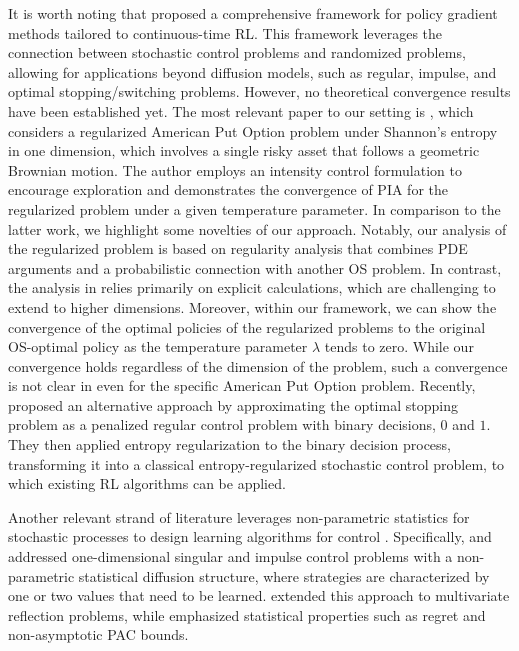 \documentclass[11pt]{amsart}
\theoremstyle{plain}
\numberwithin{equation}{section}
\begin{document}
It is worth noting that \cite{denkert2024control} proposed a comprehensive framework for policy gradient methods tailored to continuous-time RL. This framework leverages the connection between stochastic control problems and randomized problems, allowing for applications beyond diffusion models, such as regular, impulse, and optimal stopping/switching problems. However, no theoretical convergence results have been established yet. The most relevant paper to our setting is \cite{dong2024randomized}, which considers a regularized American Put Option problem under Shannon's entropy in one dimension, which involves a single risky asset that follows a geometric Brownian motion. The author employs an intensity control formulation to encourage exploration and demonstrates the convergence of PIA for the regularized problem under a given temperature parameter. 
In comparison to the latter work, we highlight some novelties of our approach. 
Notably, our analysis of the regularized problem is based on regularity analysis that combines PDE arguments and a probabilistic connection with another OS problem. In contrast, the analysis in \cite{dong2024randomized} relies primarily on explicit calculations, which are challenging to extend to higher dimensions. Moreover, within our framework, we can show the convergence of the optimal policies of the regularized problems to the original OS-optimal policy as the temperature parameter $\lambda$ tends to zero.
While our convergence holds regardless of the dimension of the problem, such a convergence is not clear in \cite{dong2024randomized} even for the specific American Put Option problem. {Recently, \cite{dai2024learning} proposed an alternative approach by approximating the optimal stopping problem as a penalized regular control problem with binary decisions, $0$ and $1$. They then applied entropy regularization to the binary decision process, transforming it into a classical entropy-regularized stochastic control problem, to which existing RL algorithms can be applied.}


Another relevant strand of literature leverages non-parametric statistics for stochastic processes to design learning algorithms for control \cite{christensen2023data2,christensen2023nonparametric,christensen2024learning,christensen2023data}. Specifically, \cite{christensen2023nonparametric} and \cite{christensen2024learning} addressed one-dimensional singular and impulse control problems with a non-parametric statistical diffusion structure, where strategies are characterized by one or two values that need to be learned. \cite{christensen2023data} extended this approach to multivariate reflection problems, while \cite{christensen2023data2} emphasized statistical properties such as regret and non-asymptotic PAC bounds.
\end{document}
